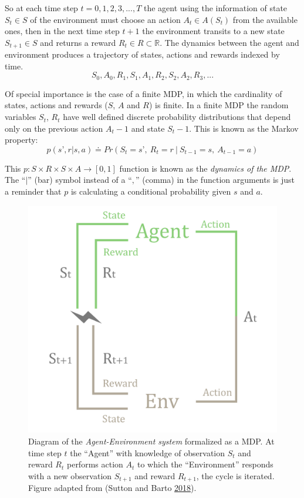 \documentclass[
  openany]{book}
\begin{document}
So at each time step \(t=0,1,2,3,...,T\) the agent using the information of state \(S_t \in S\) of the environment must choose an action \(A_t \in A(S_t)\) from the available ones, then in the next time step \(t+1\) the environment transits to a new state \(S_{t+1} \in S\) and returns a reward \(R_t \in R \subset \mathds{R}\). The dynamics between the agent and environment produces a trajectory of states, actions and rewards indexed by time.
\[ S_0, A_0, R_1, S_1, A_1, R_2, S_2, A_2, R_3, ...\]

Of special importance is the case of a finite MDP, in which the cardinality of states, actions and rewards (\(S\), \(A\) and \(R\)) is finite. In a finite MDP the random variables \(S_t\), \(R_t\) have well defined discrete probability distributions that depend only on the previous action \(A_t-1\) and state \(S_t-1\). This is known as the Markov property:
\[ p(s’, r | s, a) \doteq Pr(S_t=s’,\ R_t=r\ |\ S_{t-1}=s,\ A_{t-1}=a) \]

This \(p: S \times R \times S \times A \rightarrow [0,1]\) function is known as the \emph{dynamics of the MDP}. The ``\(|\)'' (bar) symbol instead of a ``\(,\)'' (comma) in the function arguments is just a reminder that \(p\) is calculating a conditional probability given \(s\) and \(a\).



\begin{figure}

{\centering \includegraphics[width=0.8\linewidth]{pics/agent-env} 

}

\caption{Diagram of the \emph{Agent-Environment system} formalized as a MDP. At time step \(t\) the ``Agent'' with knowledge of observation \(S_t\) and reward \(R_t\) performs action \(A_t\) to which the ``Environment'' responds with a new observation \(S_{t+1}\) and reward \(R_{t+1}\), the cycle is iterated. Figure adapted from (Sutton and Barto \protect\hyperlink{ref-sutton2018reinforcement}{2018}).}\label{fig:env-agent-interactions}
\end{figure}
\end{document}
